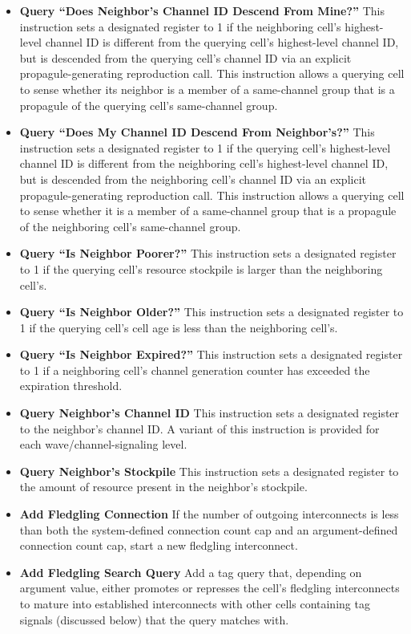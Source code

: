 \begin{itemize}
\item \textbf{Query ``Does Neighbor's Channel ID Descend From Mine?''}
This instruction sets a designated register to 1 if the neighboring cell's highest-level channel ID is different from the querying cell's highest-level channel ID, but is descended from the querying cell's channel ID via an explicit propagule-generating reproduction call.
This instruction allows a querying cell to sense whether its neighbor is a member of a same-channel group that is a propagule of the querying cell's same-channel group.
\item \textbf{Query ``Does My Channel ID Descend From Neighbor's?''}
This instruction sets a designated register to 1 if the querying cell's highest-level channel ID is different from the neighboring cell's highest-level channel ID, but is descended from the neighboring cell's channel ID  via an explicit propagule-generating reproduction call.
This instruction allows a querying cell to sense whether it is a member of a same-channel group that is a propagule of the neighboring cell's same-channel group.
\item \textbf{Query ``Is Neighbor Poorer?''}
This instruction sets a designated register to 1 if the querying cell's resource stockpile is larger than the neighboring cell's.
\item \textbf{Query ``Is Neighbor Older?''}
This instruction sets a designated register to 1 if the querying cell's cell age is less than the neighboring cell's.
\item \textbf{Query ``Is Neighbor Expired?''}
This instruction sets a designated register to 1 if a neighboring cell's channel generation counter has exceeded the expiration threshold.
\item \textbf{Query Neighbor's Channel ID}
This instruction sets a designated register to the neighbor's channel ID.
A variant of this instruction is provided for each wave/channel-signaling level.
\item \textbf{Query Neighbor's Stockpile}
This instruction sets a designated register to the amount of resource present in the neighbor's stockpile.
\item \textbf{Add Fledgling Connection}
If the number of outgoing interconnects is less than both the system-defined connection count cap and an argument-defined connection count cap, start a new fledgling interconnect.
\item \textbf{Add Fledgling Search Query}
Add a tag query that, depending on argument value, either promotes or represses the cell's fledgling interconnects to mature into established interconnects with other cells containing tag signals (discussed below) that the query matches with.

\end{itemize}
